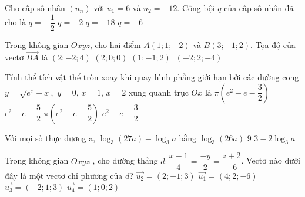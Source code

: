 \begin{ex}%
	Cho cấp số nhân $\left(u_n\right)$ với $u_1=6$ và $u_2=-12.$ Công bội $q$ của cấp số nhân đã cho là
	\choice
	{$q=-\dfrac{1}{2}$}
	{\True $q=-2$}
	{$q=-18$}
	{$q=-6$}
\end{ex}

\begin{ex}%
	Trong không gian $Oxyz$, cho hai điểm $A\left(1;1;-2\right)$ và $B\left(3;-1;2\right)$. Tọa độ của vectơ $\overrightarrow{BA}$ là
	\choice
	{$\left(2;-2;4\right)$}
	{$\left(2;0;0\right)$}
	{$\left(1;-1;2\right)$}
	{\True $~\left(-2;2;-4\right)$}
\end{ex}

\begin{ex}%
	Tính thể tích vật thể tròn xoay khi quay hình phẳng giới hạn bởi các đường cong $y=\sqrt{e^x-x},$ $y=0$, $x=1$, $x=2$ xung quanh trục $Ox$ là
	\choice
	{\True $\pi\left(e^2-e-\dfrac{3}{2}\right)$}
	{$e^2-e-\dfrac{5}{2}$}
	{$\pi\left(e^2-e-\dfrac{5}{2}\right)$}
	{$e^2-e-\dfrac{3}{2}$}
\end{ex}

\begin{ex}%
	Với mọi số thực dương a, $\log_3\left(27a\right)-\log_3a$ bằng
	\choice
	{$\log_3\left(26a\right)$}
	{$9$}
	{}
	{$3-2\log_3a$}
\end{ex}

\begin{ex}%
	Trong không gian $Oxyz$ , cho đường thẳng $d:\dfrac{x-1}{4}=\dfrac{-y}{2}=\dfrac{z+2}{-6}$. Vectơ nào dưới đây là một vectơ chỉ phương của $d$?
	\choice
	{$\overrightarrow{u_2}=\left(2;-1;3\right)$}
	{$\overrightarrow{u_1}=\left(4;2;-6\right)$}
	{\True $\overrightarrow{u_3}=\left(-2;1;3\right)$}
	{$\overrightarrow{u_4}=\left(1;0;2\right)$}
\end{ex}

